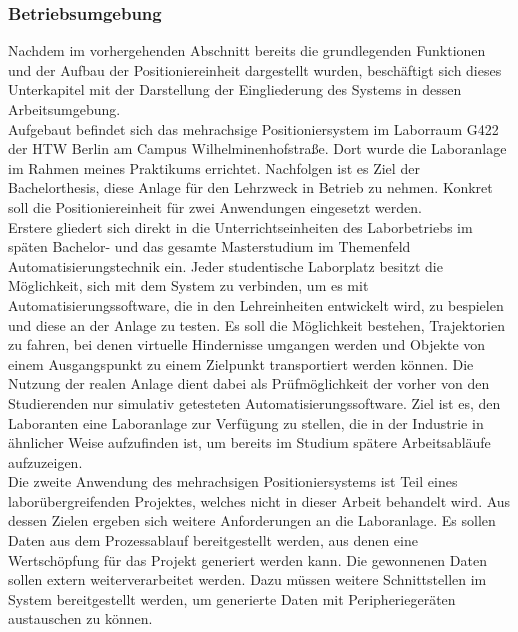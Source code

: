\documentclass[../Bachelorarbeit.tex]{subfiles}
\begin{document}
\subsubsection{Betriebsumgebung}
Nachdem im vorhergehenden Abschnitt bereits die grundlegenden Funktionen und der Aufbau der Positioniereinheit dargestellt wurden, beschäftigt sich dieses Unterkapitel mit der Darstellung der Eingliederung des Systems in dessen Arbeitsumgebung.\\
Aufgebaut befindet sich das mehrachsige Positioniersystem im Laborraum G422 der HTW Berlin am Campus Wilhelminenhofstraße. Dort wurde die Laboranlage im Rahmen meines Praktikums errichtet. Nachfolgen ist es Ziel der Bachelorthesis, diese Anlage für den Lehrzweck in Betrieb zu nehmen. Konkret soll die Positioniereinheit für zwei Anwendungen eingesetzt werden.\\
Erstere gliedert sich direkt in die Unterrichtseinheiten des Laborbetriebs im späten Bachelor- und das gesamte Masterstudium im Themenfeld Automatisierungstechnik ein. Jeder studentische Laborplatz besitzt die Möglichkeit, sich mit dem System zu verbinden, um es mit Automatisierungssoftware, die in den Lehreinheiten entwickelt wird, zu bespielen und diese an der Anlage zu testen. Es soll die Möglichkeit bestehen, Trajektorien zu fahren, bei denen virtuelle Hindernisse umgangen werden und Objekte von einem Ausgangspunkt zu einem Zielpunkt transportiert werden können. Die Nutzung der realen Anlage dient dabei als Prüfmöglichkeit der vorher von den Studierenden nur simulativ getesteten Automatisierungssoftware. Ziel ist es, den Laboranten eine Laboranlage zur Verfügung zu stellen, die in der Industrie in ähnlicher Weise aufzufinden ist, um bereits im Studium spätere Arbeitsabläufe aufzuzeigen.\\
Die zweite Anwendung des mehrachsigen Positioniersystems ist Teil eines laborübergreifenden Projektes, welches nicht in dieser Arbeit behandelt wird. Aus dessen Zielen ergeben sich weitere Anforderungen an die Laboranlage. Es sollen Daten aus dem Prozessablauf bereitgestellt werden, aus denen eine Wertschöpfung für das Projekt generiert werden kann. Die gewonnenen Daten sollen extern weiterverarbeitet werden. Dazu müssen weitere Schnittstellen im System bereitgestellt werden, um generierte Daten mit Peripheriegeräten austauschen zu können.
\end{document}

